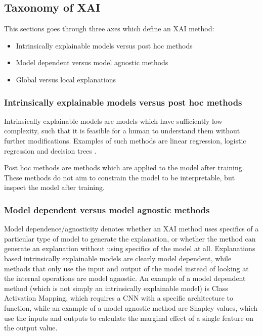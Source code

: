 \documentclass[conference,onecolumn]{IEEEtran}
\begin{document}
\subsection{Taxonomy of XAI}

This sections goes through three axes which define an XAI method:

\begin{itemize}
  \item Intrinsically explainable models versus post hoc methods
  \item Model dependent versus model agnostic methods
  \item Global versus local explanations
\end{itemize}


\subsubsection{Intrinsically explainable models versus post hoc methods}

Intrinsically explainable models are models which have sufficiently low complexity, such that it is feasible for a human to understand them without further modifications. Examples of such methods are linear regression, logistic regression and decision trees \cite{molnar}. 

Post hoc methods are methods which are applied to the model after training. These methods do not aim to constrain the model to be interpretable, but inspect the model after training.

\subsubsection{Model dependent versus model agnostic methods}

Model dependence/agnosticity denotes whether an XAI method uses specifics of a particular type of model to generate the explanation, or whether the method can generate an explanation without using specifics of the model at all. Explanations based intrinsically explainable models are clearly model dependent, while methods that only use the input and output of the model instead of looking at the internal operations are model agnostic. An example of a model dependent method (which is not simply an intrinsically explainable model) is Class Activation Mapping, which requires a CNN with a specific architecture to function, while an example of a model agnostic method are Shapley values, which use the inputs and outputs to calculate the marginal effect of a single feature on the output value.
\end{document}
